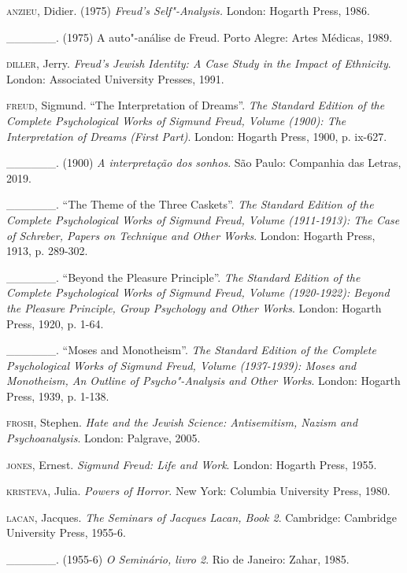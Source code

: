 \begin{Parskip}
\textsc{anzieu}, Didier. (1975) \emph{Freud's Self"-Analysis.} London: Hogarth Press, 1986.

\_\_\_\_\_\_. (1975) A auto"-análise de Freud. Porto Alegre: Artes Médicas, 1989.

\textsc{diller}, Jerry. \emph{Freud's Jewish Identity: A Case Study in the
Impact of Ethnicity}. London: Associated University Presses, 1991.

\textsc{freud}, Sigmund. ``The Interpretation of Dreams''. \emph{The Standard
Edition of the Complete Psychological Works of Sigmund Freud, Volume 
(1900): The Interpretation of Dreams (First Part)}. London: Hogarth Press, 1900, p. ix-627.

\_\_\_\_\_\_. (1900) \emph{A interpretação dos sonhos}. São Paulo: Companhia das Letras, 2019.

\_\_\_\_\_\_. ``The Theme of the Three Caskets''. \emph{The Standard
Edition of the Complete Psychological Works of Sigmund Freud, Volume 
(1911-1913): The Case of Schreber, Papers on Technique and Other Works}.
London: Hogarth Press, 1913, p. 289-302.

\_\_\_\_\_\_. ``Beyond the Pleasure Principle''. \emph{The Standard
Edition of the Complete Psychological Works of Sigmund Freud, Volume
 (1920-1922): Beyond the Pleasure Principle, Group Psychology and
Other Works}. London: Hogarth Press, 1920, p. 1-64.

\_\_\_\_\_\_. ``Moses and Monotheism''. \emph{The Standard Edition of the
Complete Psychological Works of Sigmund Freud, Volume  (1937-1939):
Moses and Monotheism, An Outline of Psycho"-Analysis and Other Works}.
London: Hogarth Press, 1939, p. 1-138.

\textsc{frosh}, Stephen. \emph{Hate and the Jewish Science: Antisemitism, Nazism
and Psychoanalysis}. London: Palgrave, 2005.

\textsc{jones}, Ernest. \emph{Sigmund Freud: Life and Work}. London: Hogarth Press, 1955.

\textsc{kristeva}, Julia. \emph{Powers of Horror}. New York: Columbia
University Press, 1980.

\textsc{lacan}, Jacques. \emph{The Seminars of Jacques Lacan, Book 2}.
Cambridge: Cambridge University Press, 1955-6.

\_\_\_\_\_\_. (1955-6) \emph{O Seminário, livro 2}. Rio de Janeiro: Zahar, 1985.
\end{Parskip}

